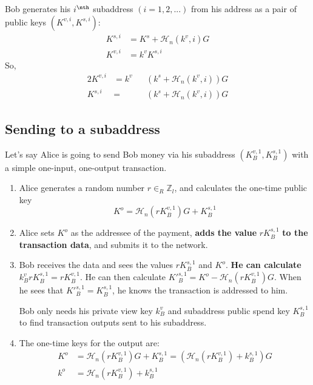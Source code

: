 Bob generates his $i^\nth$ subaddress $(i = 1, 2, ...)$ from his address as a pair of public keys $(K^{v,i}, K^{s,i})$:\vspace{.2cm}
\begin{align*}
    K^{s,i} &= K^s + \mathcal{H}_n(k^v, i) G\\
    K^{v,i} &= k^v K^{s,i}
\end{align*}
\quad So,
\begin{alignat*}{2}
    K^{v,i} &= k^v&&(k^s + \mathcal{H}_n(k^v, i))G\\
    K^{s,i} &= &&(k^s + \mathcal{H}_n(k^v, i))G
\end{alignat*}
    

\subsection{Sending to a subaddress}
    
Let's say Alice is going to send Bob money via his subaddress $(K_B^{v,1}, K_B^{s,1})$ with a simple one-input, one-output transaction.
\begin{enumerate}
	\item Alice generates a random number $r \in_R \mathbb{Z}_l$, and calculates the one-time public key\vspace{.2cm}
	\[ K^o  = \mathcal{H}_n(r K_B^{v,1})G + K_B^{s,1} \]

	\item Alice sets $K^o$ as the addressee of the payment, \textbf{adds the value} $r K_B^{s,1}$ \textbf{to the transaction data}, and submits it to the network.
	
	\item Bob receives the data and sees the values $r K_B^{s,1}$ and $K^o$. \textbf{He can calculate} $k_B^v r K_B^{s,1} = r K_B^{v,1}$. He can then calculate $K'^{s,1}_B = K^o - \mathcal{H}_n(r K_B^{v,1})G$. When he sees that $K'^{s,1}_B = K^{s,1}_B$, he knows the transaction is addressed to him.
	
	Bob only needs his private view key $k_B^v$ and subaddress public spend key $K^{s,1}_B$ to find transaction outputs sent to his subaddress.
	
	\item The one-time keys for the output are:\vspace{.2cm}
	\begin{align*}
		K^o &= \mathcal{H}_n(r K_B^{v,1})G + K_B^{s,1} = (\mathcal{H}_n(r K_B^{v,1}) + k_B^{s,1})G  \\ 
		k^o &= \mathcal{H}_n(r K_B^{v,1}) + k_B^{s,1}
	\end{align*}
\end{enumerate}

